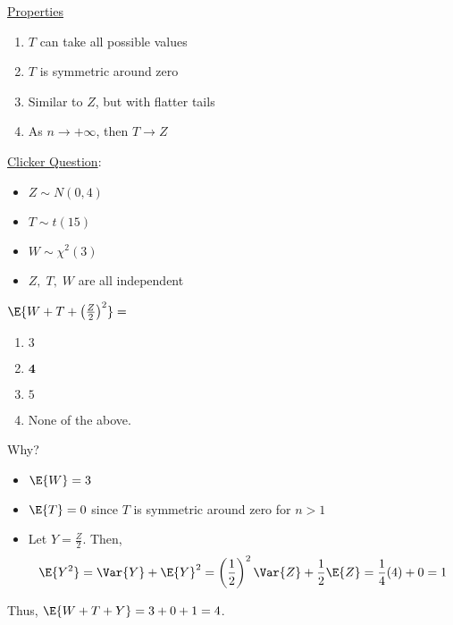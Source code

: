 \underline{Properties}
\begin{enumerate}[label=(\roman*)]
    \item $ T $ can take all possible values
    \item $ T $ is symmetric around zero
    \item Similar to $ Z $, but with flatter tails
    \item As $ n\rightarrow+\infty $, then $ T\rightarrow Z $
\end{enumerate}
\underline{Clicker Question}:
\begin{itemize}
    \item $ Z \sim N(0,4) $
    \item $ T \sim t(15) $
    \item $ W \sim \chi^2(3) $
    \item $ Z,\;T,\;W $ are all independent
\end{itemize}
$ \E{W+T+\left( \frac{Z}{2} \right)^2} = $
\begin{enumerate}[label=(\Alph*)]
    \item $ 3 $
    \item $ \symbf{4} $
    \item $ 5 $
    \item None of the above.
\end{enumerate}
Why?
\begin{itemize}
    \item $ \E{W}=3 $
    \item $ \E{T}=0 $ since $ T $ is symmetric around zero for $ n>1 $
    \item Let $ Y=\frac{Z}{2} $. Then,
          \[ \E{Y^2}=\Var{Y}+\E{Y}^2
              =\left( \frac{1}{2} \right)^2 \Var{Z}+\frac{1}{2} \E{Z}
              =\frac{1}{4}(4)+0
              =1 \]
\end{itemize}
Thus, $ \E{W+T+Y}=3+0+1=4 $.
